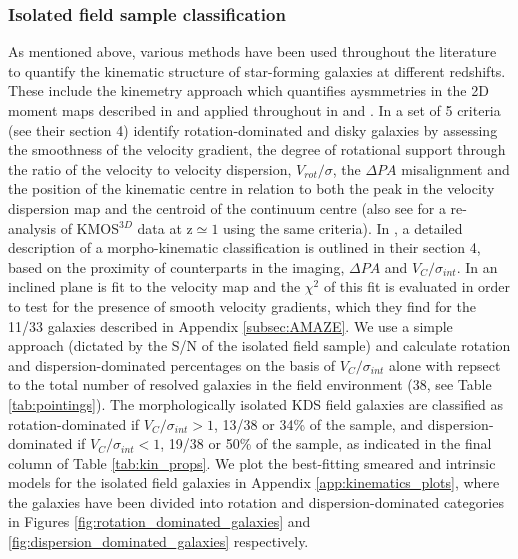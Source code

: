\documentclass[fleqn,usenatbib]{mn2e}
\begin{document}
\subsubsection{Isolated field sample classification}\label{subsubsection:isolated_classification}
As mentioned above, various methods have been used throughout the literature to quantify the kinematic structure of star-forming galaxies at different redshifts. 
These include the kinemetry approach which quantifies aysmmetries in the 2D moment maps described in \cite{Shapiro2008} and applied throughout in \cite{ForsterSchreiber2009} and \cite{Cresci2009}.
In \cite{Wisnioski2015} a set of 5 criteria (see their section 4) identify rotation-dominated and disky galaxies by assessing the smoothness of the velocity gradient, the degree of rotational support through the ratio of the velocity to velocity dispersion, $V_{rot}/\sigma$, the $\Delta PA$ misalignment and the position of the kinematic centre in relation to both the peak in the velocity dispersion map and the centroid of the continuum centre (also see \cite{Rodrigues2016} for a re-analysis of KMOS$^{3D}$ data at z$\simeq1$ using the same criteria).   
In \cite{Epinat2012}, a detailed description of a morpho-kinematic classification is outlined in their section 4, based on the proximity of counterparts in the imaging, $\Delta PA$ and $V_{C}/\sigma_{int}$.
In \cite{Gnerucci2011} an inclined plane is fit to the velocity map and the $\chi^{2}$ of this fit is evaluated in order to test for the presence of smooth velocity gradients, which they find for the 11/33 galaxies described in Appendix \ref{subsec:AMAZE}.
We use a simple approach (dictated by the S/N of the isolated field sample) and calculate rotation and dispersion-dominated percentages on the basis of $V_{C}/\sigma_{int}$ alone with repsect to the total number of resolved galaxies in the field environment (38, see Table \ref{tab:pointings}).
The morphologically isolated KDS field galaxies are classified as rotation-dominated if $V_{C}/\sigma_{int} > 1$, 13/38 or 34\% of the sample, and dispersion-dominated if $V_{C}/\sigma_{int} < 1$, 19/38 or 50\% of the sample, as indicated in the final column of Table \ref{tab:kin_props}.
We plot the best-fitting smeared and intrinsic models for the isolated field galaxies in Appendix \ref{app:kinematics_plots}, where the galaxies have been divided into rotation and dispersion-dominated categories in Figures \ref{fig:rotation_dominated_galaxies} and \ref{fig:dispersion_dominated_galaxies} respectively.
\end{document}
